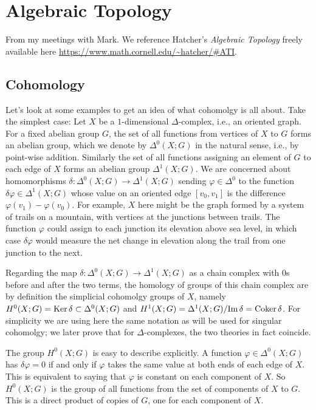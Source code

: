 \chapter{Algebraic Topology}
From my meetings with Mark. We reference Hatcher's \emph{Algebraic
  Topology} \cite{hatcher} freely available here
\url{https://www.math.cornell.edu/~hatcher/#ATI}.

\section{Cohomology}
Let's look at some examples to get an idea of what cohomolgy is all
about. Take the simplest case: Let \(X\) be a \(1\)-dimensional
\(\Delta\)-complex, i.e., an oriented graph. For a fixed abelian group
\(G\), the set of all functions from vertices of \(X\) to \(G\) forms an
abelian group, which we denote by \(\Delta^0(X;G)\) in the natural sense,
i.e., by point-wise addition. Similarly the set of all functions assigning
an element of \(G\) to each edge of \(X\) forms an abelian group
\(\Delta^1(X;G)\). We are concerned about homomorphisms
\(\delta\colon\Delta^0(X;G)\to\Delta^1(X;G)\) sending
\(\varphi\in\Delta^0\) to the function \(\delta\varphi\in\Delta^1(X;G)\)
whose value on an oriented edge \([v_0,v_1]\) is the difference
\(\varphi(v_1)-\varphi(v_0)\). For example, \(X\) here might be the graph
formed by a system of trails on a mountain, with vertices at the junctions
between trails. The function \(\varphi\) could assign to each junction its
elevation above sea level, in which case \(\delta\varphi\) would measure
the net change in elevation along the trail from one junction to the next.

Regarding the map \(\delta\colon\Delta^0(X;G)\to\Delta^1(X;G)\) as a chain
complex with \(0\)s before and after the two terms, the homology of groups
of this chain complex are by definition the simplicial cohomolgy groups of
\(X\), namely \(H^0(X;G)=\operatorname{Ker}\delta\subset\Delta^0(X;G)\) and
\(H^1(X;G)=\Delta^1(X;G)/{\operatorname{Im}\delta}=\operatorname{Coker}\delta\). For simplicity we are
using here the same notation as will be used for singular cohomolgy; we
later prove that for \(\Delta\)-complexes, the two theories in fact
coincide.

The group \(H^0(X;G)\) is easy to describe explicitly. A function
\(\varphi\in\Delta^0(X;G)\) has \(\delta\varphi=0\) if and only if
\(\varphi\) takes the same value at both ends of each edge of \(X\). This
is equivalent to saying that \(\varphi\) is constant on each component of
\(X\). So \(H^0(X;G)\) is the group of all functions from the set of
components of \(X\) to \(G\). This is a direct product of copies of \(G\),
one for each component of \(X\).

